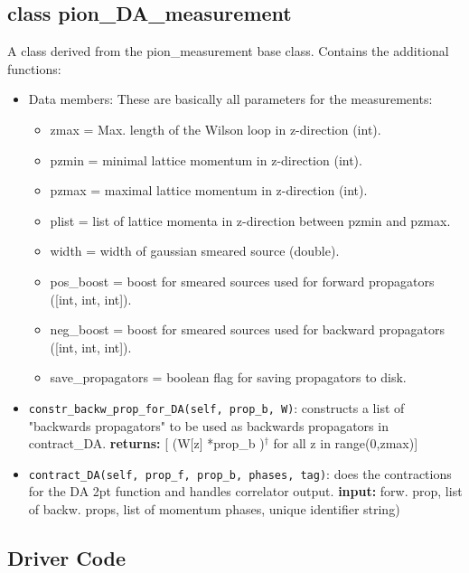 \documentclass[a4paper,10pt]{scrartcl}
\begin{document}
\subsection{class pion\_DA\_measurement}
A class derived from the pion\_measurement base class. Contains the additional functions:
\begin{itemize}
    \item Data members: These are basically all parameters for the measurements:
        \begin{itemize}
            \item zmax = Max. length of the Wilson loop in z-direction (int).
            \item pzmin = minimal lattice momentum in z-direction (int).
            \item pzmax = maximal lattice momentum in z-direction (int).
            \item plist = list of lattice momenta in z-direction between pzmin and pzmax.
            \item width = width of gaussian smeared source (double).
            \item pos\_boost = boost for smeared sources used for forward propagators ([int, int, int]).
            \item neg\_boost = boost for smeared sources used for backward propagators ([int, int, int]).
            \item save\_propagators = boolean flag for saving propagators to disk.
        \end{itemize}
    \item \lstinline{constr_backw_prop_for_DA(self, prop_b, W)}: constructs a list of "backwards propagators"
            to be used as backwards propagators in contract\_DA. \newline \textbf{returns:}  {[} (W[z] *prop\_b )$^\dagger$ for all z in range(0,zmax){]}
    \item \lstinline{contract_DA(self, prop_f, prop_b, phases, tag)}: does the contractions for the DA 2pt function and handles correlator output.
            \newline \textbf{input:} forw. prop, list of backw. props, list of momentum phases, unique identifier string) 
\end{itemize}

\subsection{Driver Code}
\end{document}
